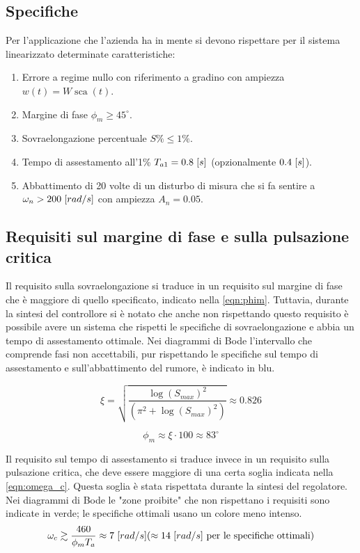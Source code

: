 \documentclass[a4paper]{article}
\DeclareMathOperator*{\sca}{\textrm{sca}}
\begin{document}
\subsection{Specifiche}
Per l’applicazione che l’azienda ha in mente si devono rispettare per il sistema linearizzato determinate caratteristiche:
\begin{enumerate}
    \item Errore a regime nullo con riferimento a gradino con ampiezza $w(t) = W \sca(t)$.
    \item Margine di fase $\phi_m \geq 45^\circ$.
    \item Sovraelongazione percentuale $S\% \leq 1\%$.
    \item Tempo di assestamento all'1\% $T_{a1} = 0.8\hspace{0.3em} [s]$ (opzionalmente $0.4 \hspace{0.3em}[s]$).
    \item Abbattimento di 20 volte di un disturbo di misura che si fa sentire a $\omega_n > 200\hspace{0.3em} [rad/s]$ con ampiezza $A_n = 0.05$.
\end{enumerate}

\subsection{Requisiti sul margine di fase e sulla pulsazione critica}
Il requisito sulla sovraelongazione si traduce in un requisito sul margine di fase che è maggiore di quello specificato, indicato nella \cref{eqn:phim}.
Tuttavia, durante la sintesi del controllore si è notato che anche non rispettando questo requisito è possibile avere un sistema che rispetti le specifiche di sovraelongazione e abbia un tempo di assestamento ottimale.
Nei diagrammi di Bode l'intervallo che comprende fasi non accettabili, pur rispettando le specifiche sul tempo di assestamento e sull'abbattimento del rumore, è indicato in blu.

\begin{equation}
    \xi = \sqrt{\frac{\log(S_{max})^2}{(\pi^2+\log(S_{max})^2)}} \approx 0.826
    \label{eqn:xi}
\end{equation}

\begin{equation}
    \phi_m \approx \xi \cdot 100 \approx 83^\circ
    \label{eqn:phim}
\end{equation}

Il requisito sul tempo di assestamento si traduce invece in un requisito sulla pulsazione critica, che deve essere maggiore di una certa soglia indicata nella \cref{eqn:omega_c}.
Questa soglia è stata rispettata durante la sintesi del regolatore. 
Nei diagrammi di Bode le "zone proibite" che non rispettano i requisiti sono indicate in verde; le specifiche ottimali usano un colore meno intenso.
\begin{equation}
    \omega_c \gtrsim \frac{460}{\phi_m T_a} \approx 7 \hspace{0.3em} [rad/s] (\approx 14 \hspace{0.3em} [rad/s] \textrm{ per le specifiche ottimali})
    \label{eqn:omega_c}
\end{equation}
\end{document}
